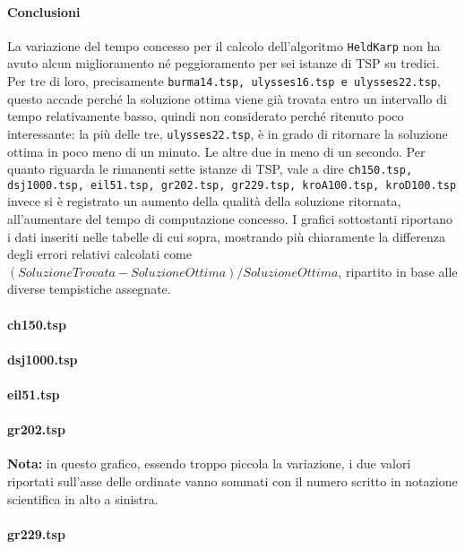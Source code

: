\paragraph{Conclusioni}
La variazione del tempo concesso per il calcolo dell'algoritmo \texttt{HeldKarp} non ha avuto alcun miglioramento né peggioramento per sei istanze di TSP su tredici. Per tre di loro, precisamente \texttt{burma14.tsp, ulysses16.tsp e ulysses22.tsp}, questo accade perché la soluzione ottima viene già trovata entro un intervallo di tempo relativamente basso, quindi non considerato perché ritenuto poco interessante: la più  delle tre, \texttt{ulysses22.tsp}, è in grado di ritornare la soluzione ottima in poco meno di un minuto. Le altre due in meno di un secondo.\eqcapo
Per quanto riguarda le rimanenti sette istanze di TSP, vale a dire \texttt{ch150.tsp, dsj1000.tsp, eil51.tsp, gr202.tsp, gr229.tsp, kroA100.tsp, kroD100.tsp} invece si è registrato un aumento della qualità della soluzione ritornata, all'aumentare del tempo di computazione concesso. I grafici sottostanti riportano i dati inseriti nelle tabelle di cui sopra, mostrando più chiaramente la differenza degli errori relativi calcolati come $(SoluzioneTrovata - SoluzioneOttima)/SoluzioneOttima$,  ripartito in base alle diverse tempistiche assegnate.
\paragraph*{ch150.tsp}
\paragraph*{dsj1000.tsp}
\paragraph*{eil51.tsp}
\paragraph*{gr202.tsp}
\textbf{Nota:} in questo grafico, essendo troppo piccola la variazione, i due valori riportati sull'asse delle ordinate vanno sommati con il numero scritto in notazione scientifica in alto a sinistra.
\paragraph*{gr229.tsp}
